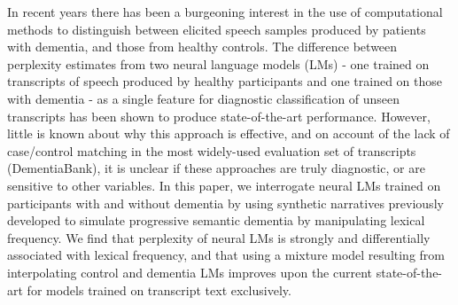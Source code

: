 In recent years there has been a burgeoning interest in the use of computational methods to distinguish between elicited speech samples produced by patients with dementia, and those from healthy controls. The difference between perplexity estimates from two neural language models (LMs) - one trained on transcripts of speech produced by healthy participants and one trained on those with dementia - as a single feature for diagnostic classification of unseen transcripts has been shown to produce state-of-the-art performance. However, little is known about why this approach is effective, and on account of the lack of case/control matching in the most widely-used evaluation set of transcripts (DementiaBank), it is unclear if these approaches are truly diagnostic, or are sensitive to other variables. In this paper, we interrogate neural LMs trained on participants with and without dementia by using synthetic narratives previously developed to simulate progressive semantic dementia by manipulating lexical frequency. We find that perplexity of neural LMs is strongly and differentially associated with lexical frequency, and that using a mixture model resulting from interpolating control and dementia LMs improves upon the current state-of-the-art for models trained on transcript text exclusively.
